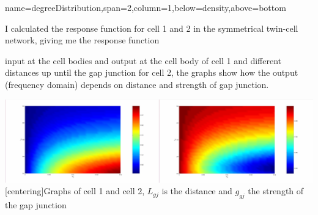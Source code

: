 \documentclass[a0paper,portrait]{baposter}
\begin{document}
\begin{poster}
{}

{name=degreeDistribution,span=2,column=1,below=density,above=bottom}{
I calculated the response function for cell 1 and 2 in the symmetrical twin-cell network, giving me the response function

input at the cell bodies and output at the cell body of cell 1 and different distances up until the gap junction for cell 2, the graphs show how the output (frequency domain) depends on distance and strength of gap junction.

\begin{center}
	\includegraphics[width=\linewidth]{cell1_2.jpg}
		[centering]{Graphs of cell 1 and cell 2, $L_{gj}$ is the distance and $g_{gj}$ the strength of the gap junction}
\end{center}

}

\end{poster}
\end{document}
